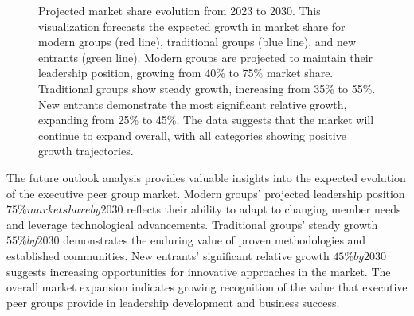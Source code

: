 \documentclass[conference]{IEEEtran}
\begin{document}
\begin{figure}[t]
\centering
{}
\caption{Projected market share evolution from 2023 to 2030. 
This visualization forecasts the expected growth in market share for modern groups (red line), 
traditional groups (blue line), and new entrants (green line). Modern groups are projected to 
maintain their leadership position, growing from 40\% to 75\% market share. Traditional groups 
show steady growth, increasing from 35\% to 55\%. New entrants demonstrate the most significant 
relative growth, expanding from 25\% to 45\%. The data suggests that the market will continue 
to expand overall, with all categories showing positive growth trajectories.}
\label{fig:future_outlook}
\end{figure}

The future outlook analysis provides valuable insights into the expected evolution of the executive peer group market. Modern groups' projected leadership position \(75\% market share by 2030\) reflects their ability to adapt to changing member needs and leverage technological advancements. Traditional groups' steady growth \(55\% by 2030\) demonstrates the enduring value of proven methodologies and established communities. New entrants' significant relative growth \(45\% by 2030\) suggests increasing opportunities for innovative approaches in the market. The overall market expansion indicates growing recognition of the value that executive peer groups provide in leadership development and business success.
\end{document}
